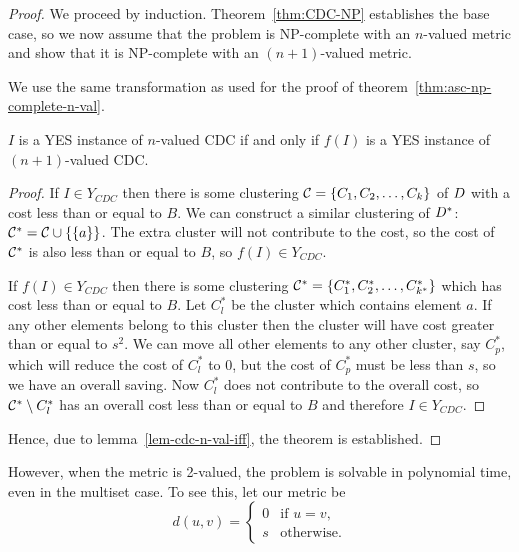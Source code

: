 \begin{proof}
  We proceed by induction.  Theorem~\ref{thm:CDC-NP} establishes the base
  case, so we now assume that the problem is NP-complete with an $n$-valued
  metric and show that it is NP-complete with an $(n+1)$-valued metric.

  We use the same transformation as used for the proof of
  theorem~\ref{thm:asc-np-complete-n-val}.

  \begin{lem}
    \label{lem-cdc-n-val-iff}
    $I$ is a YES instance of $n$-valued CDC if and only if $f(I)$ is a YES
    instance of $(n+1)$-valued CDC.
  \end{lem}

  \begin{proof}
    If $I \in Y_{CDC}$ then there is some clustering $\mathcal{C} =
    \{C_1,C_2,\dotsc,C_k\}$ of $D$ with a cost less than or equal to $B$.
    We can construct a similar clustering of $D^*$: $\mathcal{C}^* = \mathcal{C} \cup
    \{\{a\}\}$.  The extra cluster will not contribute to the cost, so the
    cost of $\mathcal{C}^*$ is also less than or equal to $B$, so $f(I) \in
    Y_{CDC}$.

    If $f(I) \in Y_{CDC}$ then there is some clustering $\mathcal{C}^* =
    \{C^*_1,C^*_2,\dotsc,C^*_{k^*}\}$ which has cost less than or equal to
    $B$.  Let $C^*_l$ be the cluster which contains element $a$.  If any other
    elements belong to this cluster then the cluster will have cost greater
    than or equal to $s^2$.  We can move all other elements to any other
    cluster, say $C^*_p$, which will reduce the cost of $C^*_l$ to 0, but the
    cost of $C^*_p$ must be less than $s$, so we have an overall saving.  Now
    $C^*_l$ does not contribute to the overall cost, so $\mathcal{C}^* \setminus
    C^*_l$ has an overall cost less than or equal to $B$ and therefore $I \in
    Y_{CDC}$.
  \end{proof}
  Hence, due to lemma~\ref{lem-cdc-n-val-iff}, the theorem is established.
\end{proof}

However, when the metric is 2-valued, the problem is solvable in polynomial
time, even in the multiset case.  To see this, let our metric be
\begin{equation*}
  d(u,v) =
  \begin{cases}
    0 & \text{if $u=v$,}\\
    s & \text{otherwise.}
  \end{cases}
\end{equation*}

